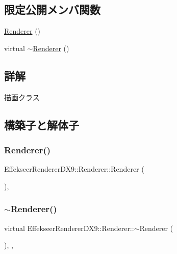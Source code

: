 \subsection*{限定公開メンバ関数}
\begin{DoxyCompactItemize}
\item 
\mbox{\hyperlink{class_effekseer_renderer_d_x9_1_1_renderer_a60053d4f038d75ec542de6643dd06cff}{Renderer}} ()
\item 
virtual \mbox{\hyperlink{class_effekseer_renderer_d_x9_1_1_renderer_ab0f89bf1d5ba64f8b661babb340a5d2c}{$\sim$\+Renderer}} ()
\end{DoxyCompactItemize}


\subsection{詳解}
描画クラス 

\subsection{構築子と解体子}
\mbox{\label{class_effekseer_renderer_d_x9_1_1_renderer_a60053d4f038d75ec542de6643dd06cff}} 
\subsubsection{\texorpdfstring{Renderer()}{Renderer()}}
{\footnotesize\ttfamily Effekseer\+Renderer\+D\+X9\+::\+Renderer\+::\+Renderer (\begin{DoxyParamCaption}{ }\end{DoxyParamCaption})\hspace{0.3cm}{\ttfamily [inline]}, {\ttfamily [protected]}}

\mbox{\label{class_effekseer_renderer_d_x9_1_1_renderer_ab0f89bf1d5ba64f8b661babb340a5d2c}} 
\subsubsection{\texorpdfstring{$\sim$\+Renderer()}{~Renderer()}}
{\footnotesize\ttfamily virtual Effekseer\+Renderer\+D\+X9\+::\+Renderer\+::$\sim$\+Renderer (\begin{DoxyParamCaption}{ }\end{DoxyParamCaption})\hspace{0.3cm}{\ttfamily [inline]}, {\ttfamily [protected]}, {\ttfamily [virtual]}}



